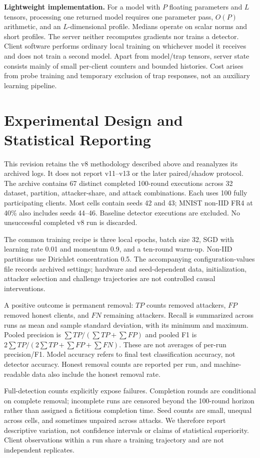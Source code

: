 \documentclass[conference]{IEEEtran}
\begin{document}
\medskip\noindent\textbf{Lightweight implementation.}
For a model with $P$ floating parameters and $L$ tensors, processing one returned model requires one parameter pass, $O(P)$ arithmetic, and an $L$-dimensional profile. Medians operate on scalar norms and short profiles. The server neither recomputes gradients nor trains a detector. Client software performs ordinary local training on whichever model it receives and does not train a second model. Apart from model/trap tensors, server state consists mainly of small per-client counters and bounded histories. Cost arises from probe training and temporary exclusion of trap responses, not an auxiliary learning pipeline.


\section{Experimental Design and Statistical Reporting}
This revision retains the v8 methodology described above and reanalyzes its archived logs. It does not report v11--v13 or the later paired/shadow protocol. The archive contains 67 distinct completed 100-round executions across 32 dataset, partition, attacker-share, and attack combinations. Each uses 100 fully participating clients. Most cells contain seeds 42 and 43; MNIST non-IID FR4 at 40\% also includes seeds 44--46. Baseline detector executions are excluded. No unsuccessful completed v8 run is discarded.

The common training recipe is three local epochs, batch size 32, SGD with learning rate 0.01 and momentum 0.9, and a ten-round warm-up. Non-IID partitions use Dirichlet concentration 0.5. The accompanying configuration-values file records archived settings; hardware and seed-dependent data, initialization, attacker selection and challenge trajectories are not controlled causal interventions.

A positive outcome is permanent removal: $TP$ counts removed attackers, $FP$ removed honest clients, and $FN$ remaining attackers. Recall is summarized across runs as mean and sample standard deviation, with its minimum and maximum. Pooled precision is $\sum TP/(\sum TP+\sum FP)$ and pooled F1 is $2\sum TP/(2\sum TP+\sum FP+\sum FN)$. These are not averages of per-run precision/F1. Model accuracy refers to final test classification accuracy, not detector accuracy. Honest removal counts are reported per run, and machine-readable data also include the honest removal rate.

Full-detection counts explicitly expose failures. Completion rounds are conditional on complete removal; incomplete runs are censored beyond the 100-round horizon rather than assigned a fictitious completion time. Seed counts are small, unequal across cells, and sometimes unpaired across attacks. We therefore report descriptive variation, not confidence intervals or claims of statistical superiority. Client observations within a run share a training trajectory and are not independent replicates.
\end{document}
